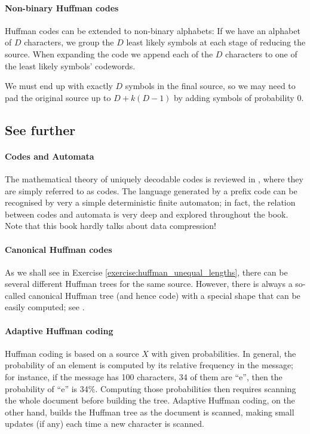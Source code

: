 \documentclass[a4paper, 11pt]{article}
\numberwithin{equation}{section}
\theoremstyle{plain}
\theoremstyle{definition}
\begin{document}
\paragraph{Non-binary Huffman codes}

Huffman codes can be extended to non-binary alphabets: If we have an alphabet of $D$ characters, we group the $D$ least likely symbols at each stage of reducing the source. When expanding the code we append each of the $D$ characters to one of the least likely symbols’ codewords.

We must end up with exactly $D$ symbols in the final source, so we may need to pad the original source up to $D+k(D-1)$ by adding symbols of probability $0$.

\subsection{See further}

\paragraph{Codes and Automata} The mathematical theory of uniquely decodable codes is reviewed in \cite{BPR10}, where they are simply referred to as codes. The language generated by a prefix code can be recognised by very a simple deterministic finite automaton; in fact, the relation between codes and automata is very deep and explored throughout the book. Note that this book hardly talks about data compression!

\paragraph{Canonical Huffman codes} As we shall see in Exercise \ref{exercise:huffman_unequal_lengths}, there can be several different Huffman trees for the same source. However, there is always a so-called canonical Huffman tree (and hence code) with a special shape that can be easily computed; see \cite[3.2.2]{Say12}.

\paragraph{Adaptive Huffman coding} Huffman coding is based on a source $X$ with given probabilities. In general, the probability of an element is computed by its relative frequency in the message; for instance, if the message has 100 characters, 34 of them are ``e'', then the probability of ``e'' is 34\%. Computing those probabilities then requires scanning the whole document before building the tree. Adaptive Huffman coding, on the other hand, builds the Huffman tree as the document is scanned, making small updates (if any) each time a new character is scanned.
\end{document}

